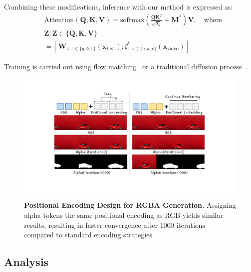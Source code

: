 Combining these modifications, inference with our method is expressed as:
\begin{equation}
\begin{aligned}
    &\text{Attention}(\mathbf{Q}, \mathbf{K}, \mathbf{V}) = \text{softmax}\left(\frac{\mathbf{Q}\mathbf{K}^T}{\sqrt{d_k}}+\mathbf{M}^*\right)\mathbf{V}, \quad \text{where} \\
&\mathbf{Z : Z \in \{Q, K, V\}} \\&= [\mathbf{W}_{z : z \in \{q, k, v\}}(\mathbf{x}_{\text{text}}); \mathbf{f}^*_{z : z \in \{q, k, v\}}(\mathbf{x}_{\text{video}})]
\end{aligned}
\label{eq:our_method}
\end{equation}

Training is carried out using flow matching~\cite{liu2022flow} or a traditional diffusion process~\cite{ho2020denoising}.


\begin{figure}[t]
    \centering
    \includegraphics[width=1.0\linewidth]{figs/method-pe_init.pdf}
    \vspace{-0.2in}
    \caption{\textbf{Positional Encoding Design for RGBA Generation.} Assigning alpha tokens the same positional encoding as RGB yields similar results, resulting in faster convergence after 1000 iterations compared to standard encoding strategies.}
    \label{fig-pe}
    \vspace{-0.1in}
\end{figure}

\subsection{Analysis}

